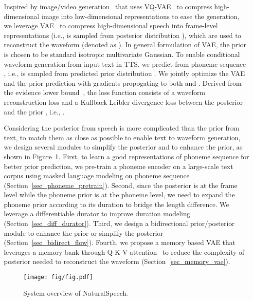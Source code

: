 \documentclass{article}
\theoremstyle{definition}
\def\myname{NaturalSpeech}
\begin{document}
Inspired by image/video generation~\cite{ramesh2021zero,ding2021cogview,wu2021nuwa,yan2021videogpt,rakhimov2020latent} that uses VQ-VAE~\cite{van2017neural,razavi2019generating,esser2021taming} to compress high-dimensional image into low-dimensional representations to ease the generation, we leverage VAE~\cite{kingma2013auto} to compress high-dimensional speech  into frame-level representations  (i.e.,  is sampled from posterior distribution ), which are used to reconstruct the waveform (denoted as ). In general formulation of VAE, the prior  is chosen to be standard isotropic multivariate Gaussian. To enable conditional waveform generation from input text in TTS, we predict  from phoneme sequence , i.e.,  is sampled from predicted prior distribution . We jointly optimize the VAE and the prior prediction with gradients propogating to both  and . Derived from the evidence lower bound~\cite{kingma2013auto}, the loss function consists of a waveform reconstruction loss  and a Kullback-Leibler divergence loss between the posterior  and the prior , i.e., . 


Considering the posterior from speech is more complicated than the prior from text, to match them as close as possible to enable text to waveform generation, we design several modules to simplify the posterior and to enhance the prior, as shown in Figure~\ref{fig_model_overall}. First, to learn a good representations of phoneme sequence for better prior prediction, we pre-train a phoneme encoder on a large-scale text corpus using masked language modeling on phoneme sequence (Section~\ref{sec_phoneme_pretrain}). Second, since the posterior is at the frame level while the phoneme prior is at the phoneme level, we need to expand the phoneme prior according to its duration to bridge the length difference. We leverage a differentiable durator to improve duration modeling (Section~\ref{sec_diff_durator}). Third, we design a bidirectional prior/posterior module to enhance the prior or simplify the posterior (Section~\ref{sec_bidirect_flow}). Fourth, we propose a memory based VAE that leverages a memory bank through Q-K-V attention~\citep{vaswani2017attention} to reduce the complexity of posterior needed to reconstruct the waveform (Section~\ref{sec_memory_vae}). 



\begin{figure} [t!]
\centering
    \texttt{[image: fig/fig.pdf]}
    \caption{System overview of \myname{}.}
  \label{fig_model_overall}
\vspace{-0.3cm}
\end{figure}
\end{document}
